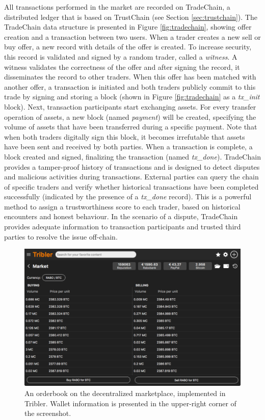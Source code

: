 \documentclass[USenglish]{article}
\begin{document}
All transactions performed in the market are recorded on TradeChain, a distributed ledger that is based on TrustChain (see Section \ref{sec:trustchain}).
The TradeChain data structure is presented in Figure \ref{fig:tradechain}, showing offer creation and a transaction between two users.
When a trader creates a new sell or buy offer, a new record with details of the offer is created.
To increase security, this record is validated and signed by a random trader, called a \emph{witness}.
A witness validates the correctness of the offer and after signing the record, it disseminates the record to other traders.
When this offer has been matched with another offer, a transaction is initiated and both traders publicly commit to this trade by signing and storing a block (shown in Figure \ref{fig:tradechain} as a \emph{tx\_init} block).
Next, transaction participants start exchanging assets.
For every transfer operation of assets, a new block (named \emph{payment}) will be created, specifying the volume of assets that have been transferred during a specific payment.
Note that when both traders digitally sign this block, it becomes irrefutable that assets have been sent and received by both parties.
When a transaction is complete, a block created and signed, finalizing the transaction (named \emph{tx\_done}).
TradeChain provides a tamper-proof history of transactions and is designed to detect disputes and malicious activities during transactions.
External parties can query the chain of specific traders and verify whether historical transactions have been completed successfully (indicated by the presence of a \emph{tx\_done} record).
This is a powerful method to assign a trustworthiness score to each trader, based on historical encounters and honest behaviour.
In the scenario of a dispute, TradeChain provides adequate information to transaction participants and trusted third parties to resolve the issue off-chain.

\begin{figure}[t]
	\centering
	\includegraphics[width=0.9\columnwidth]{assets/tribler_market}
	\caption{An orderbook on the decentralized marketplace, implemented in Tribler. Wallet information is presented in the upper-right corner of the screenshot.}
	\label{fig:tribler_market}
\end{figure}
\end{document}
